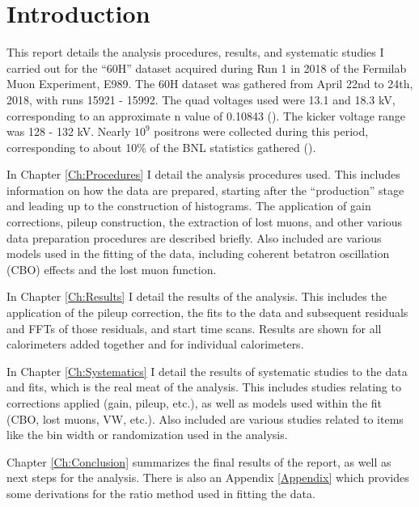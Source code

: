 \chapter{Introduction}
\label{Ch:Introduction}

This report details the analysis procedures, results, and systematic studies I carried out for the ``60H'' dataset acquired during Run 1 in 2018 of the Fermilab Muon \gmtwo Experiment, E989. The 60H dataset was gathered from April 22nd to 24th, 2018, with runs 15921 - 15992. The quad voltages used were 13.1 and 18.3 kV, corresponding to an approximate n value of 0.10843 (). The kicker voltage range was 128 - 132 kV. Nearly $10^{9}$ positrons were collected during this period, corresponding to about 10\% of the BNL statistics gathered ().

In Chapter \ref{Ch:Procedures} I detail the analysis procedures used. This includes information on how the data are prepared, starting after the ``production'' stage and leading up to the construction of histograms. The application of gain corrections, pileup construction, the extraction of lost muons, and other various data preparation procedures are described briefly. Also included are various models used in the fitting of the data, including coherent betatron oscillation (CBO) effects and the lost muon function.

In Chapter \ref{Ch:Results} I detail the results of the analysis. This includes the application of the pileup correction, the fits to the data and subsequent residuals and FFTs of those residuals, and start time scans. Results are shown for all calorimeters added together and for individual calorimeters.

In Chapter \ref{Ch:Systematics} I detail the results of systematic studies to the data and fits, which is the real meat of the analysis. This includes studies relating to corrections applied (gain, pileup, etc.), as well as models used within the fit (CBO, lost muons, VW, etc.). Also included are various studies related to items like the bin width or randomization used in the analysis.

Chapter \ref{Ch:Conclusion} summarizes the final results of the report, as well as next steps for the analysis. There is also an Appendix \ref{Appendix} which provides some derivations for the ratio method used in fitting the data.
